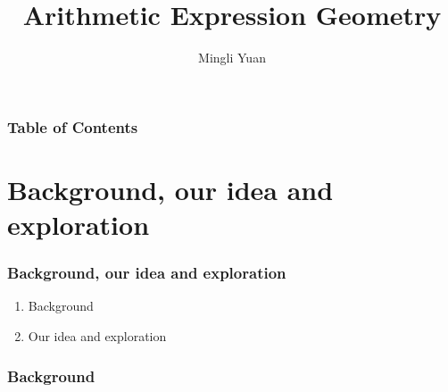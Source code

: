 \documentclass[aspectratio=169]{beamer}
\title{Arithmetic Expression Geometry}
\author[Author] {Mingli Yuan}
\begin{document}
\pgfplotsset{compat=1.18}

\begin{frame}
\maketitle
\end{frame}

\begin{frame}
\frametitle{Table of Contents}
\tableofcontents
\end{frame}

\section{Background, our idea and exploration}

\begin{frame}
    \frametitle{Background, our idea and exploration}
    \begin{enumerate}
        \item Background
        \item Our idea and exploration
    \end{enumerate}
\end{frame}

\begin{frame}
    \frametitle{Background}
    \begin{figure}[ht]\centering
    \end{figure}
\end{frame}
\end{document}
